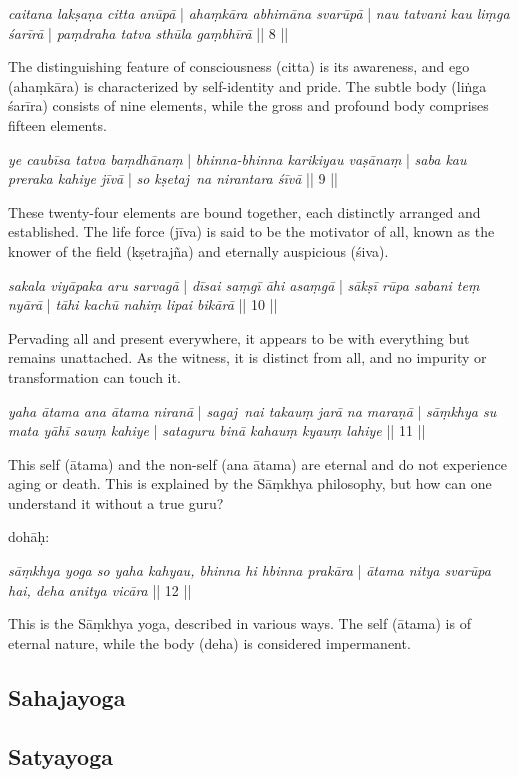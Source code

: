 \textit{caitana lakṣaṇa citta anūpā} | \textit{ahaṃkāra abhimāna svarūpā} | 
\textit{nau tatvani kau liṃga śarīrā} | \textit{paṃdraha tatva sthūla gaṃbhīrā} || 8 ||

The distinguishing feature of consciousness (citta) is its awareness, and ego (ahaṃkāra) is characterized by self-identity and pride. The subtle body (liṅga śarīra) consists of nine elements, while the gross and profound body comprises fifteen elements.

\textit{ye caubīsa tatva baṃdhānaṃ} | \textit{bhinna-bhinna karikiyau vaṣānaṃ} |
\textit{saba kau preraka kahiye jīvā} | \textit{so kṣetaj~na nirantara śīvā} || 9 || 

These twenty-four elements are bound together, each distinctly arranged and established. The life force (jīva) is said to be the motivator of all, known as the knower of the field (kṣetrajña) and eternally auspicious (śiva).

\textit{sakala viyāpaka aru sarvagā} | \textit{dīsai saṃgī āhi asaṃgā} |
\textit{sākṣī rūpa sabani teṃ nyārā} | \textit{tāhi kachū nahiṃ lipai bikārā} || 10 ||

Pervading all and present everywhere, it appears to be with everything but remains unattached. As the witness, it is distinct from all, and no impurity or transformation can touch it.

\textit{yaha ātama ana ātama niranā} | \textit{sagaj~nai takauṃ jarā na maraṇā} | 
\textit{sāṃkhya su mata yāhī sauṃ kahiye} | \textit{sataguru binā kahauṃ kyauṃ lahiye} || 11 || 

This self (ātama) and the non-self (ana ātama) are eternal and do not experience aging or death. This is explained by the Sāṃkhya philosophy, but how can one understand it without a true guru?

   
dohāḥ: 

\textit{sāṃkhya yoga so yaha kahyau, bhinna hi hbinna prakāra} | 
\textit{ātama nitya svarūpa hai, deha anitya vicāra} || 12 ||

This is the Sāṃkhya yoga, described in various ways. The self (ātama) is of eternal nature, while the body (deha) is considered impermanent.

\subsection{Sahajayoga}
\label{sahajayoga}



\subsection{Satyayoga}
\label{satyayoga}

